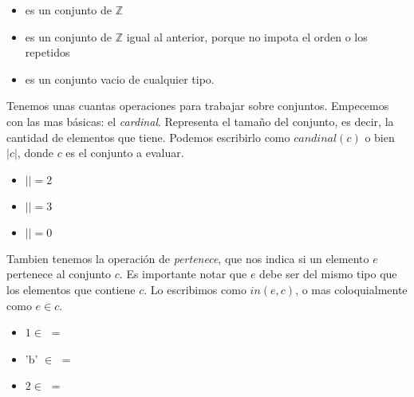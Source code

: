 \documentclass{article}
\begin{document}
\begin{center}
	\begin{itemize}
	
		\item {} es un conjunto de $\mathbb{Z}$
		\item {} es un conjunto de $\mathbb{Z}$ igual al anterior, porque no impota el orden o los repetidos
		\item \set{} es un conjunto vacio de cualquier tipo.
	
	\end{itemize}
\end{center}

Tenemos unas cuantas operaciones para trabajar sobre conjuntos. Empecemos con las mas básicas: el \textit{cardinal}. Representa el tamaño del conjunto, es decir, la cantidad de elementos que tiene. Podemos escribirlo como $candinal(c)$ o bien $|c|$, donde $c$ es el conjunto a evaluar.

\begin{multicols}{3}
\begin{center}
	\begin{itemize}
	
		\item[] $|$$| = 2$
		\item[] $|$$| = 3$
		\item[] $|$\set{}$| = 0$
			
	\end{itemize}
\end{center}
\end{multicols}

Tambien tenemos la operación de \textit{pertenece}, que nos indica si un elemento $e$ pertenece al conjunto $c$. Es importante notar que $e$ debe ser del mismo tipo que los elementos que contiene $c$. Lo escribimos como $in(e, c)$, o mas coloquialmente como $e \in c$.

\begin{multicols}{3}
\begin{center}
	\begin{itemize}
	
		\item[] $1 \in$  $=$ \True
		\item[] 'b' $\in$  $=$ \False
		\item[] $2 \in$ \set{} $=$ \False
			
	\end{itemize}
\end{center}
\end{multicols}
\end{document}
